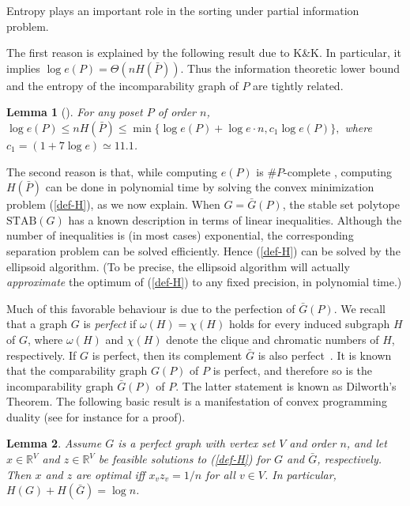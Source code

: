 \documentclass{article} \usepackage{fullpage}
\newtheorem{lemma}{Lemma}
\newcommand{\STAB}{\mathrm{STAB}}
\begin{document}
Entropy plays an important role in the sorting under partial information problem. 

The first reason is explained by the following result due to K\&K. In particular, it implies $\log e(P) = \Theta(nH(\bar{P}))$. Thus the information theoretic lower bound and the entropy of the incomparability graph of $P$ are tightly related.

\begin{lemma}[\cite{KK95}]
\label{lem:kk}
For any poset $P$ of order $n$,
$\log e(P) \leq nH(\bar{P}) \leq \min \{\log e(P) + \log e \cdot n, c_1 \log e(P)\},$
where $c_1 = (1+7\log e) \simeq 11.1$.
\end{lemma}

The second reason is that, while computing $e(P)$ is $\#P$-complete \cite{BW91}, computing $H(\bar{P})$ can be done in polynomial time by solving the convex minimization problem (\ref{def-H}), as we now explain. When $G = \bar{G}(P)$, the stable set polytope $\STAB(G)$ has a known description in terms of linear inequalities. Although the number of inequalities is (in most cases) exponential, the corresponding separation problem can be solved efficiently. Hence (\ref{def-H}) can be solved by the ellipsoid algorithm. 
(To be precise, the ellipsoid algorithm will actually {\em approximate}
the optimum of (\ref{def-H}) to any fixed precision, in polynomial time.)

Much of this favorable behaviour is due to the perfection of $\bar{G}(P)$. We recall that a graph $G$ is {\sl perfect\/} if $\omega(H)=\chi(H)$ holds for every induced subgraph $H$ of $G$, where $\omega(H)$ and $\chi(H)$ denote the clique and chromatic numbers of $H$, respectively. If $G$ is perfect, then its complement $\bar{G}$ is also perfect~\cite{L72}. It is known that the comparability graph $G(P)$ of $P$ is perfect, and therefore so is the incomparability graph $\bar{G}(P)$ of $P$. The latter statement is known as Dilworth's Theorem. The following basic result is a manifestation of convex programming duality (see for instance \cite{S95} for a proof).

\begin{lemma}
\label{lem:perf}
Assume $G$ is a perfect graph with vertex set $V$ and order $n$, and let $x \in \mathbb{R}^V$ and $z \in \mathbb{R}^V$ be feasible solutions to (\ref{def-H}) for $G$ and $\bar{G}$, respectively. Then $x$ and $z$ are optimal iff $x_v z_v = 1/n$ for all $v \in V$. In particular, $H(G) + H(\bar G)=\log n$.
\end{lemma}
\end{document}
